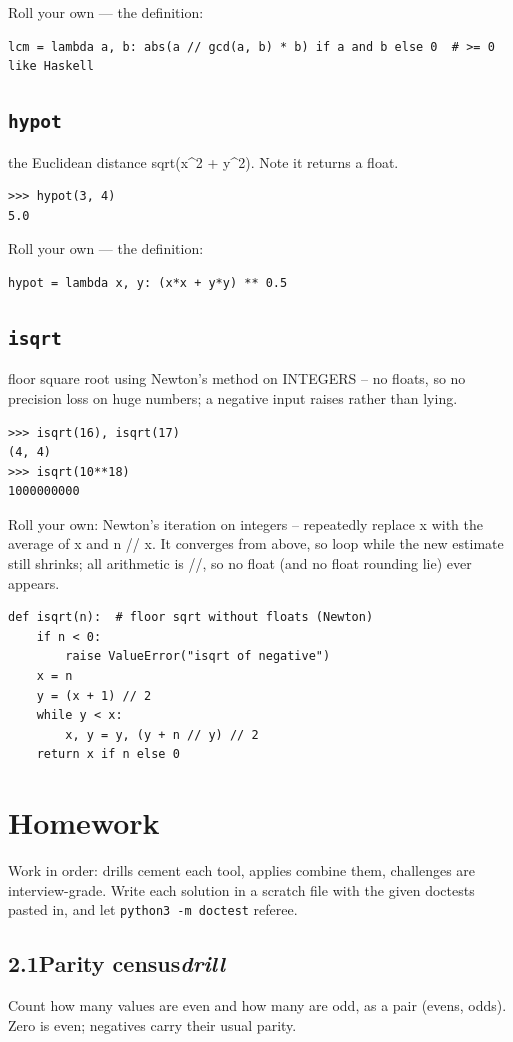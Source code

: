 \documentclass[10pt,letterpaper]{book}
\begin{document}
Roll your own --- the definition:

\begin{lstlisting}[style=ex]
lcm = lambda a, b: abs(a // gcd(a, b) * b) if a and b else 0  # >= 0 like Haskell
\end{lstlisting}
\subsection{\texttt{hypot}}\label{def:hypot}
the Euclidean distance sqrt(x\^{}2 + y\^{}2). Note it returns a float.
\begin{lstlisting}[style=ex]
>>> hypot(3, 4)
5.0
\end{lstlisting}

Roll your own --- the definition:

\begin{lstlisting}[style=ex]
hypot = lambda x, y: (x*x + y*y) ** 0.5
\end{lstlisting}
\subsection{\texttt{isqrt}}\label{def:isqrt}
floor square root using Newton's method on INTEGERS -- no floats, so no precision loss on huge numbers; a negative input raises rather than lying.
\begin{lstlisting}[style=ex]
>>> isqrt(16), isqrt(17)
(4, 4)
>>> isqrt(10**18)
1000000000
\end{lstlisting}

Roll your own: Newton's iteration on integers -- repeatedly replace x with the average of x and n // x. It converges from above, so loop while the new estimate still shrinks; all arithmetic is //, so no float (and no float rounding lie) ever appears.

\begin{lstlisting}[style=ex]
def isqrt(n):  # floor sqrt without floats (Newton)
    if n < 0:
        raise ValueError("isqrt of negative")
    x = n
    y = (x + 1) // 2
    while y < x:
        x, y = y, (y + n // y) // 2
    return x if n else 0
\end{lstlisting}
\section{Homework}
Work in order: drills cement each tool, applies combine them,
challenges are interview-grade. Write each solution in a scratch file with
the given doctests pasted in, and let \texttt{python3 -m doctest} referee.
\subsection*{2.1\quad Parity census\hfill\textnormal{\textit{drill}}}
Count how many values are even and how many are odd, as a pair (evens, odds). Zero is even; negatives carry their usual parity.
\end{document}
